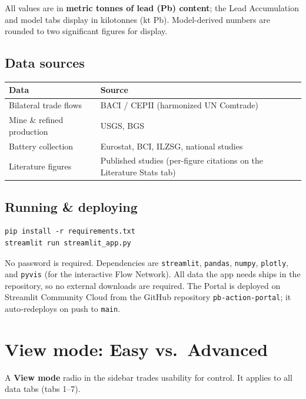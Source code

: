 \documentclass[11pt,a4paper]{article}
\newcommand{\code}[1]{\texttt{\small #1}}
\begin{document}
All values are in \textbf{metric tonnes of lead (Pb) content}; the Lead
Accumulation and model tabs display in kilotonnes (kt Pb). Model-derived numbers
are rounded to two significant figures for display.

\subsection{Data sources}

\begin{longtable}{L{5.5cm} L{8.5cm}}
\toprule
\textbf{Data} & \textbf{Source} \\
\midrule
\endhead
Bilateral trade flows & BACI / CEPII (harmonized UN Comtrade) \\
Mine \& refined production & USGS, BGS \\
Battery collection & Eurostat, BCI, ILZSG, national studies \\
Literature figures & Published studies (per-figure citations on the Literature
Stats tab) \\
\bottomrule
\end{longtable}

\subsection{Running \& deploying}

\begin{lstlisting}
pip install -r requirements.txt
streamlit run streamlit_app.py
\end{lstlisting}

No password is required. Dependencies are \code{streamlit}, \code{pandas},
\code{numpy}, \code{plotly}, and \code{pyvis} (for the interactive Flow Network).
All data the app needs ships in the repository, so no external downloads are
required. The Portal is deployed on Streamlit Community Cloud from the GitHub
repository \code{pb-action-portal}; it auto-redeploys on push to \code{main}.

\section{View mode: Easy vs.\ Advanced}

A \textbf{View mode} radio in the sidebar trades usability for control. It applies
to all data tabs (tabs 1--7).
\end{document}
